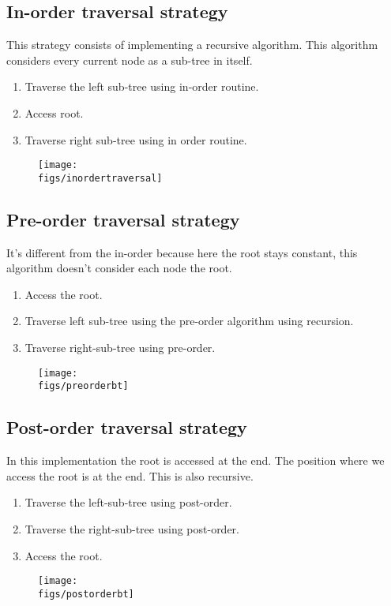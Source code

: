 \subsection{In-order traversal strategy}
This strategy consists of implementing a recursive algorithm. This algorithm considers every current node as a sub-tree in itself.
\begin{enumerate}
    \item Traverse the left sub-tree using in-order routine. 
    \item Access root.
    \item Traverse right sub-tree using in order routine.
\end{enumerate}
\begin{figure}[H]
    \centering
    \texttt{[image: \\figs/inordertraversal]}
\end{figure}


\subsection{Pre-order traversal strategy}
It's different from the in-order because here the root stays constant, this algorithm doesn't consider each node the root.
\begin{enumerate}
    \item Access the root. 
    \item Traverse left sub-tree using the pre-order algorithm using recursion. 
    \item Traverse right-sub-tree using pre-order.
\end{enumerate}
\begin{figure}[H]
    \centering
    \texttt{[image: \\figs/preorderbt]}
\end{figure}


\subsection{Post-order traversal strategy}
In this implementation the root is accessed at the end. The position where we access the root is at the end. This is also recursive. 
\begin{enumerate}
    \item Traverse the left-sub-tree using post-order. 
    \item Traverse the right-sub-tree using post-order.
    \item Access the root.
\end{enumerate}
\begin{figure}[H]
    \centering
    \texttt{[image: \\figs/postorderbt]}
\end{figure}


